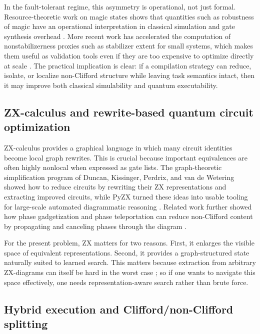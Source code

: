 \documentclass[11pt]{article}
\theoremstyle{remark}
\begin{document}
In the fault-tolerant regime, this asymmetry is operational, not just formal. Resource-theoretic work on magic states shows that quantities such as robustness of magic have an operational interpretation in classical simulation and gate synthesis overhead \cite{howard_campbell_2017}. More recent work has accelerated the computation of nonstabilizerness proxies such as stabilizer extent for small systems, which makes them useful as validation tools even if they are too expensive to optimize directly at scale \cite{hamaguchi_et_al_2025}. The practical implication is clear: if a compilation strategy can reduce, isolate, or localize non-Clifford structure while leaving task semantics intact, then it may improve both classical simulability and quantum executability.

\subsection{ZX-calculus and rewrite-based quantum circuit optimization}

ZX-calculus provides a graphical language in which many circuit identities become local graph rewrites. This is crucial because important equivalences are often highly nonlocal when expressed as gate lists. The graph-theoretic simplification program of Duncan, Kissinger, Perdrix, and van de Wetering showed how to reduce circuits by rewriting their ZX representations and extracting improved circuits, while PyZX turned these ideas into usable tooling for large-scale automated diagrammatic reasoning \cite{duncan_et_al_2020, pyzx_2020}. Related work further showed how phase gadgetization and phase teleportation can reduce non-Clifford content by propagating and canceling phases through the diagram \cite{kissinger_vdw_2020}.

For the present problem, ZX matters for two reasons. First, it enlarges the visible space of equivalent representations. Second, it provides a graph-structured state naturally suited to learned search. This matters because extraction from arbitrary ZX-diagrams can itself be hard in the worst case \cite{debeaudrap_et_al_2022}; so if one wants to navigate this space effectively, one needs representation-aware search rather than brute force.

\subsection{Hybrid execution and Clifford/non-Clifford splitting}
\end{document}
